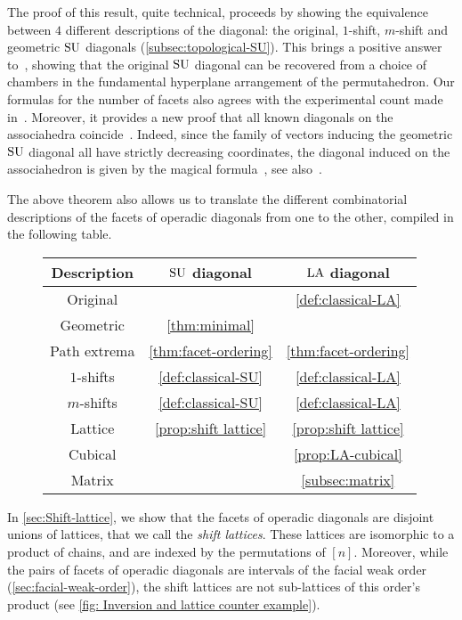The proof of this result, quite technical, proceeds by showing the equivalence between $4$ different descriptions of the diagonal: the original, $1$-shift, $m$-shift and geometric $\mathrm{SU}$ diagonals (\cref{subsec:topological-SU}).
This brings a positive answer to~\cite[Rem.~2.19]{LaplanteAnfossi}, showing that the original $\mathrm{SU}$ diagonal can be recovered from a choice of chambers in the fundamental hyperplane arrangement of the permutahedron. 
Our formulas for the number of facets also agrees with the experimental count made in~\cite{VejdemoJohansson}.
Moreover, it provides a new proof that all known diagonals on the associahedra coincide~\cite{SaneblidzeUmble-comparingDiagonals}.
Indeed, since the family of vectors inducing the geometric $\mathrm{SU}$ diagonal all have strictly decreasing coordinates, the diagonal induced on the associahedron is given by the magical formula~\cite[Thm.~2]{MasudaThomasTonksVallette}, see also~\cite[Prop.~3.8]{LaplanteAnfossi}.

The above theorem also allows us to translate the different combinatorial descriptions of the facets of operadic diagonals from one to the other, compiled in the following table. 

\begin{figure}[h!]
	\begin{center}
	\begin{tabular}{c|c|c}
	Description & $\mathrm{SU}$ diagonal & $\mathrm{LA}$ diagonal \\
	\hline
	Original & \cite{SaneblidzeUmble} & \cref{def:classical-LA} \\
	Geometric & \cref{thm:minimal} & \cite{LaplanteAnfossi} \\
	Path extrema & \cref{thm:facet-ordering} & \cref{thm:facet-ordering} \\
	$1$-shifts & \cref{def:classical-SU} & \cref{def:classical-LA} \\
	$m$-shifts & \cref{def:classical-SU} & \cref{def:classical-LA} \\
	Lattice & \cref{prop:shift lattice} & \cref{prop:shift lattice} \\
	Cubical & \cite{SaneblidzeUmble} & \cref{prop:LA-cubical} \\
	Matrix & \cite{SaneblidzeUmble} & \cref{subsec:matrix} 
	\end{tabular}
	\end{center}
\end{figure}

In \cref{sec:Shift-lattice}, we show that the facets of operadic diagonals are disjoint unions of lattices, that we call the \emph{shift lattices}.
These lattices are isomorphic to a product of chains, and are indexed by the permutations of $[n]$.
Moreover, while the pairs of facets of operadic diagonals are intervals of the facial weak order (\cref{sec:facial-weak-order}), the shift lattices are not sub-lattices of this order's product (see \cref{fig: Inversion and lattice counter example}). 

